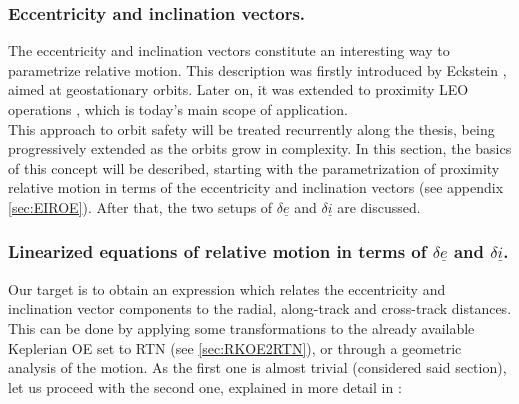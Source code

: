 		\subsubsection{Eccentricity and inclination vectors.}
		\indent The eccentricity and inclination vectors constitute an interesting way to parametrize relative motion. This description was firstly introduced by Eckstein \cite{Eckstein}, aimed at geostationary orbits. Later on, it was extended to proximity LEO operations \cite{Montenbruck_DAmico}, which is today's main scope of application. \\
		\indent This approach to orbit safety will be treated recurrently along the thesis, being progressively extended as the orbits grow in complexity. In this section, the basics of this concept will be described, starting with the parametrization of proximity relative motion in terms of the eccentricity and inclination vectors (see appendix \ref{sec:EIROE}). After that, the two setups of $\delta \underline{e}$ and $\delta \underline{i}$ are discussed.
		\subsubsection{Linearized equations of relative motion in terms of $\delta\underline{e}$ and $\delta\underline{i}$.}
		\indent Our target is to obtain an expression which relates the eccentricity and inclination vector components to the radial, along-track and cross-track distances. This can be done by applying some transformations to the already available Keplerian OE set to RTN (see \ref{sec:RKOE2RTN}), or through a geometric analysis of the motion. As the first one is almost trivial (considered said section), let us proceed with the second one, explained in more detail in \cite{DAmico_Montenbruck}:\\
